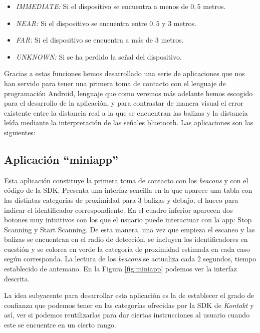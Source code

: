 \begin{itemize}
	\item \textit{IMMEDIATE:} Si el dispositivo se encuentra a menos de $0,5$ metros.
	\item \textit{NEAR:} Si el dispositivo se encuentra entre $0,5$ y $3$ metros.
	\item \textit{FAR:} Si el dispositivo se encuentra a más de $3$ metros.
	\item \textit{UNKNOWN:} Si se ha perdido la señal del dispositivo.
\end{itemize}

Gracias a estas funciones hemos desarrollado una serie de aplicaciones que nos han servido para tener una primera toma de contacto con el lenguaje de programación Android, lenguaje que como veremos más adelante hemos escogido para el desarrollo de la aplicación, y para contrastar de manera visual el error existente entre la distancia real a la que se encuentran las balizas y la distancia leída mediante la interpretación de las señales bluetooth. Las aplicaciones son las siguientes:

\subsection{Aplicación ``miniapp''}
Esta aplicación constituye la primera toma de contacto con los \textit{beacons} y con el código de la SDK. Presenta una interfaz sencilla en la que aparece una tabla con las distintas categorías de proximidad para 3 balizas y debajo, el hueco para indicar el identificador correspondiente. En el cuadro inferior aparecen dos botones muy intuitivos con los que el usuario puede interactuar con la app: Stop Scanning y Start Scanning. De esta manera, una vez que empieza el escaneo y las balizas se encuentran en el radio de detección, se incluyen los identificadores en cuestión y se colorea en verde la categoría de proximidad estimada en cada caso según corresponda. La lectura de los \textit{beacons} se actualiza cada 2 segundos, tiempo establecido de antemano. En la Figura \ref{fig:miniapp} podemos ver la interfaz descrita.

La idea subyacente para desarrollar esta aplicación es la de establecer el grado de confianza que podemos tener en las categorías ofrecidas por la SDK de \textit{Kontakt} y así, ver si podemos reutilizarlas para dar ciertas instrucciones al usuario cuando este se encuentre en un cierto rango. %

